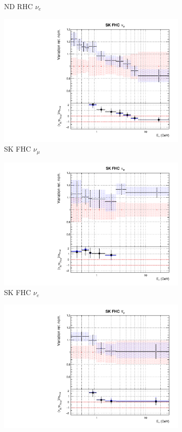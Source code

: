 \begin{figure}
\begin{subfigure}{0.24\textwidth}
  \caption{ND RHC $\nu_e$}
\end{subfigure}
\begin{subfigure}{0.24\textwidth}
  \centering
  \includegraphics[width=0.95\linewidth]{figs/fixed2p2hflux8}
  \caption{SK FHC $\nu_{\mu}$}
\end{subfigure}
\begin{subfigure}{0.24\textwidth}
  \centering
  \includegraphics[width=0.95\linewidth]{figs/fixed2p2hflux9}
  \caption{SK FHC $\nu_e$}
\end{subfigure}
\begin{subfigure}{0.24\textwidth}
  \centering
  \includegraphics[width=0.95\linewidth]{figs/fixed2p2hflux10}

\end{subfigure}
\end{figure}
